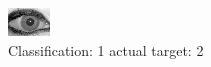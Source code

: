 \begin{figure}[h!]
\begin{center}
\includegraphics[width=0.60\columnwidth]{figures/ID2042_class_1_target_2.png}
\end{center}
\caption{ Classification: 1 actual target: 2}
\label{fig:ID2042_class_1_target_2}
\end{figure}
